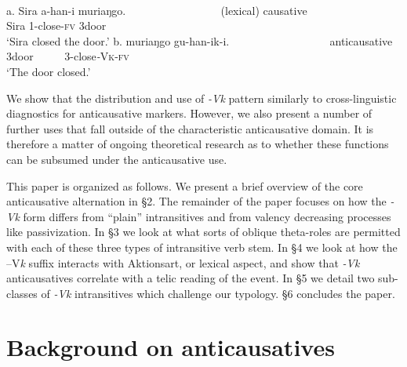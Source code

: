 \documentclass[output=paper]{langsci/langscibook}
\begin{document}
\ea
\ea
{}\\
\gll a.  Sira a-han-i       muriaŋgo.~~~ ~~~ ~~~ ~~~ ~~    (lexical) causative\\
       Sira 1-close-\textsc{fv} 3door\\
\glt ‘Sira closed the door.’
\ex
\gll b.  muriaŋgo gu-han-ik-i.~~~ ~~~ ~~~ ~~~ ~~~     anticausative\\
       3door ~~~~~3-close\textit{-}\textsc{Vk}-\textsc{fv}\\
\glt ‘The door closed.’
\z
\z

We show that the distribution and use of \textit{-Vk} pattern similarly to cross-linguistic diagnostics for anticausative markers. However, we also present a number of further uses that fall outside of the characteristic anticausative domain. It is therefore a matter of ongoing theoretical research as to whether these functions can be subsumed under the anticausative use.

  This paper is organized as follows. We present a brief overview of the core anticausative alternation in §2. The remainder of the paper focuses on how the \textit{-Vk }form differs from “plain” intransitives and from valency decreasing processes like passivization. In §3 we look at what sorts of oblique theta-roles are permitted with each of these three types of intransitive verb stem. In §4 we look at how the –V\textit{k }suffix interacts with Aktionsart, or lexical aspect, and show that \textit{-Vk} anticausatives correlate with a telic reading of the event. In §5 we detail two sub-classes of \textit{-Vk} intransitives which challenge our typology. §6 concludes the paper. 

\section{Background on anticausatives}
\end{document}
